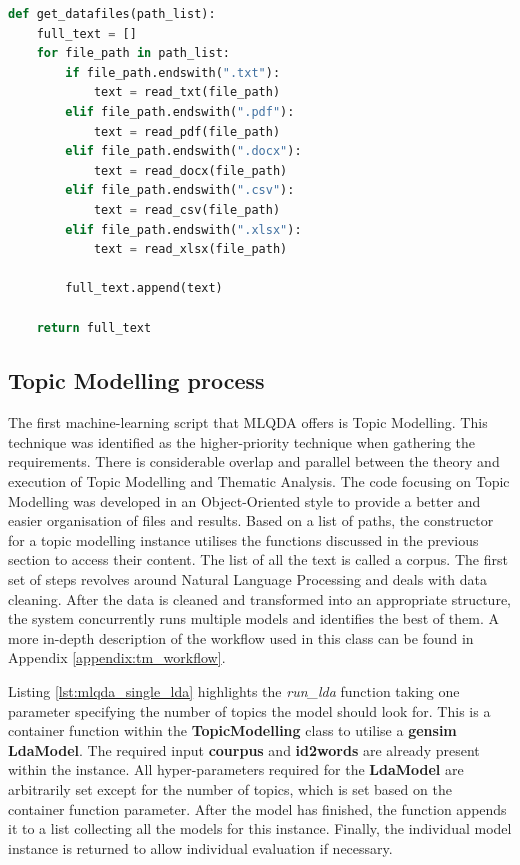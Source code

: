 \documentclass{l4proj}
\begin{document}
\begin{lstlisting}[language=python,
caption={Function to read in all the files.},
label=lst:read_all]
def get_datafiles(path_list):
    full_text = []
    for file_path in path_list:
        if file_path.endswith(".txt"):
            text = read_txt(file_path)
        elif file_path.endswith(".pdf"):
            text = read_pdf(file_path)
        elif file_path.endswith(".docx"):
            text = read_docx(file_path)
        elif file_path.endswith(".csv"):
            text = read_csv(file_path)
        elif file_path.endswith(".xlsx"):
            text = read_xlsx(file_path)

        full_text.append(text)

    return full_text
\end{lstlisting}

\subsection{Topic Modelling process}

The first machine-learning script that MLQDA offers is Topic Modelling. This technique was identified as the higher-priority technique when gathering the requirements. There is considerable overlap and parallel between the theory and execution of Topic Modelling and Thematic Analysis. The code focusing on Topic Modelling was developed in an Object-Oriented style to provide a better and easier organisation of files and results. Based on a list of paths, the constructor for a topic modelling instance utilises the functions discussed in the previous section to access their content. The list of all the text is called a corpus. The first set of steps revolves around Natural Language Processing and deals with data cleaning. After the data is cleaned and transformed into an appropriate structure, the system concurrently runs multiple models and identifies the best of them. A more in-depth description of the workflow used in this class can be found in Appendix \ref{appendix:tm_workflow}.

Listing \ref{lst:mlqda_single_lda} highlights the \textit{run\_lda} function taking one parameter specifying the number of topics the model should look for. This is a container function within the \textbf{TopicModelling} class to utilise a \textbf{gensim} \textbf{LdaModel}. The required input \textbf{courpus} and \textbf{id2words} are already present within the instance. All hyper-parameters required for the \textbf{LdaModel} are arbitrarily set except for the number of topics, which is set based on the container function parameter. After the model has finished, the function appends it to a list collecting all the models for this instance. Finally, the individual model instance is returned to allow individual evaluation if necessary.
\end{document}
